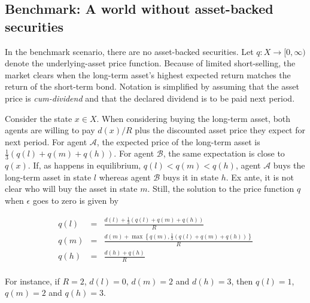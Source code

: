 \documentclass[11pt]{article}
\theoremstyle{plain}
\begin{document}
\subsection{Benchmark: A world without asset-backed securities} \label{benchmark}

In the benchmark scenario, there are no asset-backed securities. Let $q:X\to[0,\infty)$ denote the underlying-asset price function. Because of limited short-selling, the market clears when the long-term asset's highest expected return matches the return of the short-term bond. Notation is simplified by assuming that the asset price is \textit{cum-dividend} and that the declared dividend is to be paid next period.

Consider the state $x \in X$. When considering buying the long-term asset, both agents are willing to pay $d(x)/R$ plus the discounted asset price they expect for next period. For agent $\mathcal{A}$, the expected price of the long-term asset is $\frac{1}{3}\left(q(l)+q(m)+q(h)\right)$. For agent $\mathcal{B}$, the same expectation is close to $q(x)$. If, as happens in equilibrium, $q(l)<q(m)<q(h)$, agent $\mathcal{A}$ buys the long-term asset in state $l$ whereas agent $\mathcal{B}$ buys it in state $h$. Ex ante, it is not clear who will buy the asset in state $m$. Still, the solution to the price function $q$ when $\epsilon$ goes to zero is given by

\begin{eqnarray}
q(l) & = & \frac{d(l)+\frac{1}{3}\left(q(l)+q(m)+q(h)\right)}{R} \label{ql} \\
q(m) & = & \frac{ d(m) + \max \left\{ q(m), \frac{1}{3} \left( q(l)+q(m)+q(h)\right) \right\} } {R} \label{qm}\\
q(h) & = & \frac{d(h)+q(h)}{R} \label{qh}
\end{eqnarray}
\\
For instance, if $R=2$, $d(l)=0$, $d(m)=2$ and $d(h)=3$, then $q(l)=1$, $q(m)=2$ and $q(h)=3$.
\end{document}
